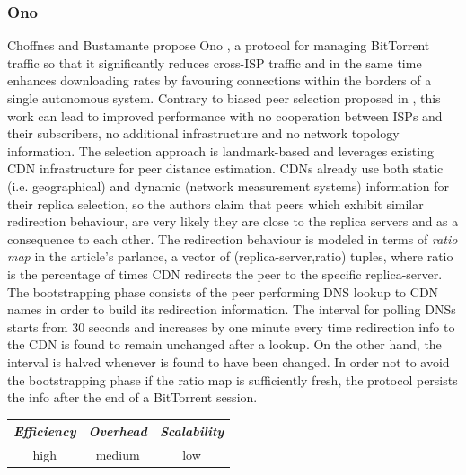 \subsubsection{Ono}
Choffnes and Bustamante propose Ono \cite{CB2008}, a protocol for managing
BitTorrent traffic so that it significantly reduces cross-ISP traffic and in
the same time enhances downloading rates by favouring connections within the
borders of a single autonomous system. Contrary to biased peer selection
proposed in \cite{BCCMSBZ2006}, this work can lead to improved
performance with no cooperation between ISPs and their subscribers, no
additional infrastructure and no network topology information. The selection
approach is landmark-based and leverages existing CDN infrastructure for peer
distance estimation. CDNs already use both static (i.e. geographical) and
dynamic (network measurement systems) information for their replica selection,
so the authors claim that peers which exhibit similar redirection behaviour, are
very likely they are close to the replica servers and as a consequence to each
other. The redirection behaviour is modeled in terms of \emph{ratio map} in the
article's parlance, a vector of (replica-server,ratio) tuples, where ratio is
the percentage of times CDN redirects the peer to the specific replica-server.
The bootstrapping phase consists of the peer performing DNS lookup to CDN names
in order to build its redirection information. The interval for polling DNSs
starts from 30 seconds and increases by one minute every time redirection info
to the CDN is found to remain unchanged after a lookup. On the other hand, the
interval is halved whenever is found to have been changed. In order not to avoid
the bootstrapping phase if the ratio map is sufficiently fresh, the protocol
persists the info after the end of a BitTorrent session.

\begin{center}
\begin{tabular}{ccc}
\emph{Efficiency} & \emph{Overhead} & \emph{Scalability} \\
\hline
high &
medium &
low
\end{tabular}
\end{center}

